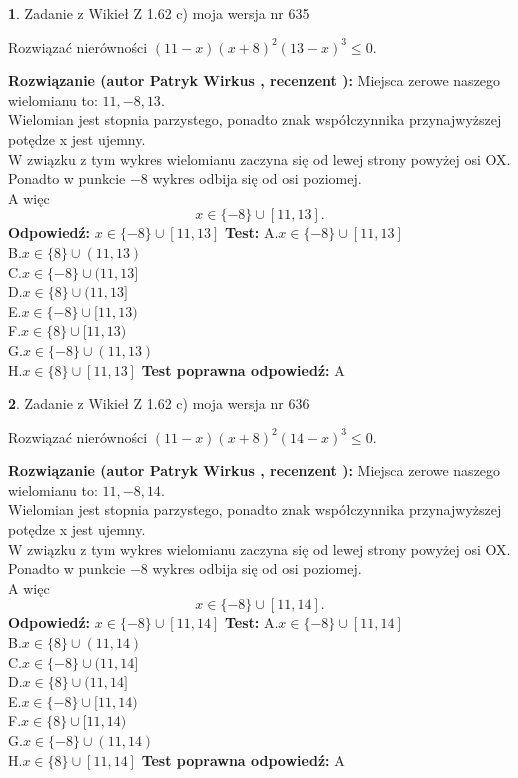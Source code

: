 \documentclass[12pt, a4paper]{article}
\theoremstyle{definition} %
\newtheorem{zad}{}
\newcommand{\zadStart}[1]{\begin{zad}#1\newline}
\newcommand{\zadStop}{\end{zad}}
\newcommand{\rozwStart}[2]{\noindent \textbf{Rozwiązanie (autor #1 , recenzent #2): }\newline}
\newcommand{\rozwStop}{\newline}
\newcommand{\odpStart}{\noindent \textbf{Odpowiedź:}\newline}
\newcommand{\odpStop}{\newline}
\newcommand{\testStart}{\noindent \textbf{Test:}\newline}
\newcommand{\testStop}{\newline}
\newcommand{\kluczStart}{\noindent \textbf{Test poprawna odpowiedź:}\newline}
\newcommand{\kluczStop}{\newline}
\begin{document}
\zadStart{Zadanie z Wikieł Z 1.62 c) moja wersja nr 635}

Rozwiązać nierówności $(11-x)(x+8)^{2}(13-x)^{3}\le0$.
\zadStop
\rozwStart{Patryk Wirkus}{}
Miejsca zerowe naszego wielomianu to: $11, -8, 13$.\\
Wielomian jest stopnia parzystego, ponadto znak współczynnika przy\linebreak najwyższej potędze x jest ujemny.\\ W związku z tym wykres wielomianu zaczyna się od lewej strony powyżej osi OX.\\
Ponadto w punkcie $-8$ wykres odbija się od osi poziomej.\\
A więc $$x \in \{-8\} \cup [11,13].$$
\rozwStop
\odpStart
$x \in \{-8\} \cup [11,13]$
\odpStop
\testStart
A.$x \in \{-8\} \cup [11,13]$\\
B.$x \in \{8\} \cup (11,13)$\\
C.$x \in \{-8\} \cup (11,13]$\\
D.$x \in \{8\} \cup (11,13]$\\
E.$x \in \{-8\} \cup [11,13)$\\
F.$x \in \{8\} \cup [11,13)$\\
G.$x \in \{-8\} \cup (11,13)$\\
H.$x \in \{8\} \cup [11,13]$
\testStop
\kluczStart
A
\kluczStop



\zadStart{Zadanie z Wikieł Z 1.62 c) moja wersja nr 636}

Rozwiązać nierówności $(11-x)(x+8)^{2}(14-x)^{3}\le0$.
\zadStop
\rozwStart{Patryk Wirkus}{}
Miejsca zerowe naszego wielomianu to: $11, -8, 14$.\\
Wielomian jest stopnia parzystego, ponadto znak współczynnika przy\linebreak najwyższej potędze x jest ujemny.\\ W związku z tym wykres wielomianu zaczyna się od lewej strony powyżej osi OX.\\
Ponadto w punkcie $-8$ wykres odbija się od osi poziomej.\\
A więc $$x \in \{-8\} \cup [11,14].$$
\rozwStop
\odpStart
$x \in \{-8\} \cup [11,14]$
\odpStop
\testStart
A.$x \in \{-8\} \cup [11,14]$\\
B.$x \in \{8\} \cup (11,14)$\\
C.$x \in \{-8\} \cup (11,14]$\\
D.$x \in \{8\} \cup (11,14]$\\
E.$x \in \{-8\} \cup [11,14)$\\
F.$x \in \{8\} \cup [11,14)$\\
G.$x \in \{-8\} \cup (11,14)$\\
H.$x \in \{8\} \cup [11,14]$
\testStop
\kluczStart
A
\kluczStop
\end{document}
